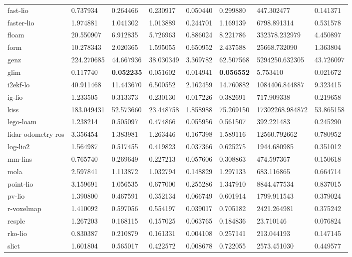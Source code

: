 \begin{table}[]
{\begin{tabular}{llllllll}
		fast-lio & 0.737934 & 0.264466 & 0.230917 & 0.050440 & 0.299880 & 447.302477 & 0.141371 \\
		faster-lio & 1.974881 & 1.041302 & 1.013889 & 0.244701 & 1.169139 & 6798.891314 & 0.531578 \\
		floam & 20.550907 & 6.912835 & 5.726963 & 0.886024 & 8.221786 & 332378.232979 & 4.450897 \\
		form & 10.278343 & 2.020365 & 1.595055 & 0.650952 & 2.437588 & 25668.732090 & 1.363804 \\
		genz & 224.270685 & 44.667936 & 38.030349 & 3.369782 & 62.507568 & 5294250.632305 & 43.726097 \\
		glim & 0.117740 & \textbf{0.052235} & 0.051602 & 0.014941 & \textbf{0.056552} & 5.753410 & 0.021672 \\
		i2ekf-lo & 40.911468 & 11.443670 & 6.500552 & 2.162459 & 14.760882 & 1084406.844887 & 9.323415 \\
		ig-lio & 1.233505 & 0.313373 & 0.230130 & 0.017226 & 0.382691 & 717.909338 & 0.219658 \\
		kiss & 183.049431 & 52.573660 & 23.448758 & 1.858988 & 75.269150 & 17302268.984872 & 53.865158 \\
		lego-loam & 1.238214 & 0.505097 & 0.474866 & 0.055956 & 0.561507 & 392.221483 & 0.245290 \\
		lidar-odometry-ros & 3.356454 & 1.383981 & 1.263446 & 0.167398 & 1.589116 & 12560.792662 & 0.780952 \\
		log-lio2 & 1.564987 & 0.517455 & 0.419823 & 0.037366 & 0.625275 & 1944.680985 & 0.351012 \\
		mm-lins & 0.765740 & 0.269649 & 0.227213 & 0.057606 & 0.308863 & 474.597367 & 0.150618 \\
		mola & 2.597841 & 1.113872 & 1.032794 & 0.148829 & 1.297133 & 683.116865 & 0.664714 \\
		point-lio & 3.159691 & 1.056535 & 0.677000 & 0.255286 & 1.347910 & 8844.477534 & 0.837015 \\
		pv-lio & 1.390800 & 0.467591 & 0.352134 & 0.066749 & 0.601914 & 1799.911543 & 0.379024 \\
		r-voxelmap & 1.410092 & 0.597056 & 0.554197 & 0.039017 & 0.705182 & 2421.264981 & 0.375242 \\
		resple & 1.267203 & 0.168115 & 0.157025 & 0.063765 & 0.184836 & 23.710146 & 0.076824 \\
		rko-lio & 0.830387 & 0.210879 & 0.161331 & 0.004108 & 0.257141 & 213.044193 & 0.147145 \\
		slict & 1.601804 & 0.565017 & 0.422572 & 0.008678 & 0.722055 & 2573.451030 & 0.449577 \\

\end{tabular}}
\end{table}

